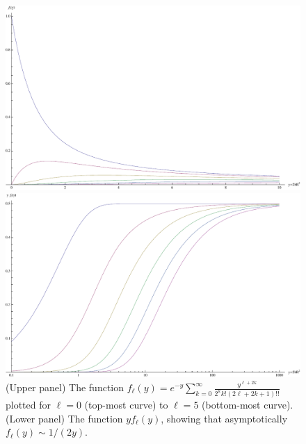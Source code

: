 \documentclass{article}
\begin{document}
\begin{figure}
\begin{center}
\includegraphics[width=\textwidth]{fly}
\end{center}
\begin{center}
\includegraphics[width=\textwidth]{logfly}
\end{center}
\caption{(Upper panel) The function
$f_\ell(y) = e^{-y} \sum_{k=0}^\infty \frac{y^{\ell+2k}}{2^k k! (2\ell+2k+1)!!}$
plotted for $\ell = 0$ (top-most curve) to $\ell = 5$ (bottom-most curve).
(Lower panel) The function $y f_\ell(y)$, showing that asymptotically
$f_\ell(y) \sim 1/(2y)$.}
\label{fig:fly}
\end{figure}
\end{document}
